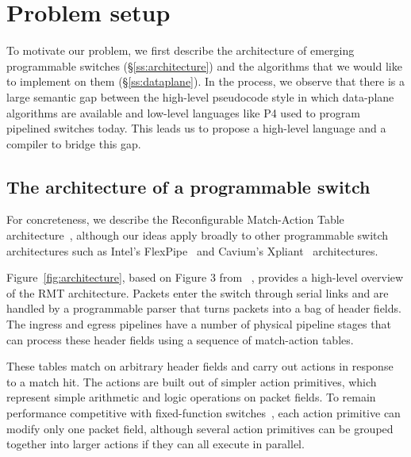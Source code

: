 \section{Problem setup}
\label{s:context}

To motivate our problem, we first describe the architecture of emerging
programmable switches (\S\ref{ss:architecture}) and the algorithms that we
would like to implement on them (\S\ref{ss:dataplane}). In the process, we
observe that there is a large semantic gap between the high-level pseudocode
style in which data-plane algorithms are available and low-level languages
like P4 used to program pipelined switches today. This leads us to propose
a high-level language and a compiler to bridge this gap.

\subsection{The architecture of a programmable switch}
\label{s:architecture}
For concreteness, we describe the Reconfigurable Match-Action Table
architecture~\cite{rmt}, although our ideas apply broadly to other programmable
switch architectures such as Intel's FlexPipe~\cite{flexpipe} and Cavium's
Xpliant~\cite{xpliant} architectures.

Figure~\ref{fig:architecture}, based on Figure 3 from ~\cite{rmt}, provides a
high-level overview of the RMT architecture. Packets enter the switch through
serial links and are handled by a programmable parser that turns packets into a
bag of header fields. The ingress and egress pipelines have a number of
physical pipeline stages that can process these header fields using a sequence
of match-action tables.

These tables match on arbitrary header fields and carry out actions in response
to a match hit.  The actions are built out of simpler action primitives, which
represent simple arithmetic and logic operations on packet fields. To remain
performance competitive with fixed-function switches~\cite{mellanox, broadcom},
each action primitive can modify only one packet field, although several action
primitives can be grouped together into larger actions if they can all execute
in parallel.

